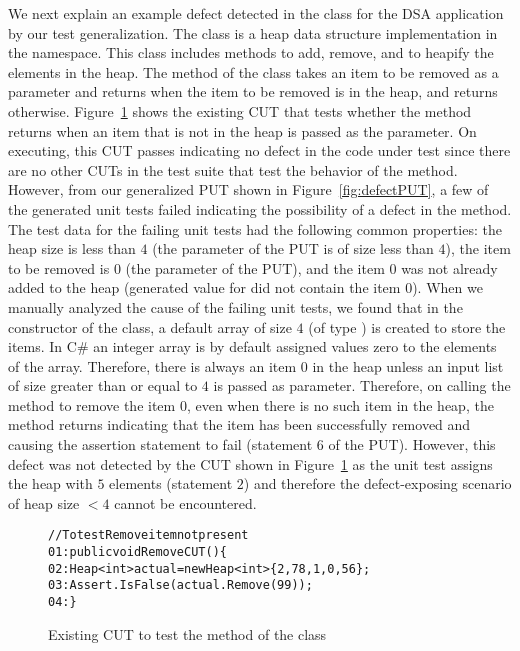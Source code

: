 We next explain an example defect detected in the  class for the DSA application by our test generalization. The  class is a heap data structure implementation in the  namespace. This class includes methods to add, remove, and to heapify the elements in the heap. The  method of the class takes an item to be removed as a parameter and returns  when the item to be removed is in the heap, and returns  otherwise. Figure~\ref{fig:defectCUT} shows the existing CUT that tests whether the  method returns  when an item that is not in the heap is passed as the parameter. On executing, this CUT passes indicating no defect in the code under test since there are no other CUTs in the test suite that test the behavior of the method. However, from our generalized PUT shown in Figure~\ref{fig:defectPUT}, a few of the generated unit tests failed indicating the possibility of a defect in the  method. The test data for the failing unit tests had the following common properties: the heap size is less than $4$ (the  parameter of the PUT is of size less than $4$), the item to be removed is $0$ (the  parameter of the PUT), and the item $0$ was not already added to the heap (generated value for  did not contain the item $0$). When we manually analyzed the cause of the failing unit tests, we found that in the constructor of the  class, a default array of size $4$ (of type ) is created to store the items. In C\# an integer array is by default assigned values zero to the elements of the array. Therefore, there is always an item $0$ in the heap unless an input list of size greater than or equal to $4$ is passed as parameter. Therefore, on calling the  method to remove the item $0$, even when there is no such item in the heap, the method returns  indicating that the item has been successfully removed and causing the assertion statement to fail (statement $6$ of the PUT). However, this defect was not detected by the CUT shown in Figure~\ref{fig:defectCUT} as the unit test assigns the heap with $5$ elements (statement $2$) and therefore the defect-exposing scenario of heap size $< 4$ cannot be encountered. 

\begin{figure}[t]
\begin{CodeOut}
\begin{alltt}
//To test Remove item not present
01: public void RemoveCUT()\{
02: \hspace*{0.07in}Heap<int> actual = new Heap<int> \{2, 78, 1, 0, 56\};
03: \hspace*{0.07in}Assert.IsFalse(actual.Remove(99));
04: \hspace*{0.02in}\}
\end{alltt}
\end{CodeOut} \vspace*{-2ex}
\caption{Existing CUT to test the  method of the  class}
\label{fig:defectCUT}
\end{figure}

